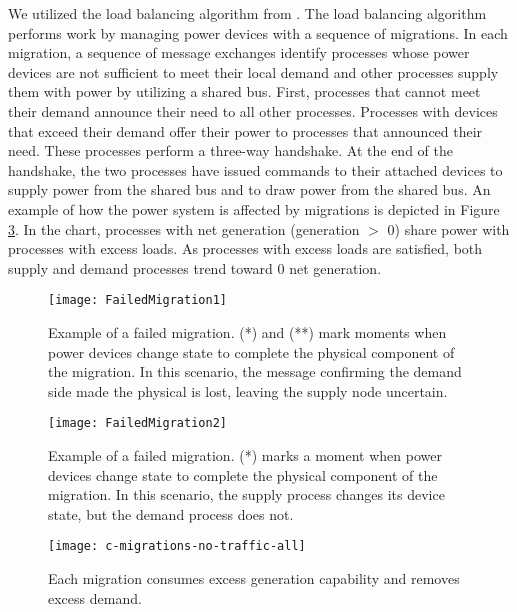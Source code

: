 We utilized the load balancing algorithm from \cite{LOADBALANCING}.
The load balancing algorithm performs work by managing power devices with a sequence of migrations\cite{HILTESTBED}.
In each migration, a sequence of message exchanges identify processes whose power devices are not sufficient to meet their local demand and other processes supply them with power by utilizing a shared bus.
First, processes that cannot meet their demand announce their need to all other processes.
Processes with devices that exceed their demand offer their power to processes that announced their need.
These processes perform a three-way handshake.
At the end of the handshake, the two processes have issued commands to their attached devices to supply power from the shared bus and to draw power from the shared bus.
An example of how the power system is affected by migrations is depicted in Figure \ref{fig:good-migrations}.
In the chart, processes with net generation (generation $>$ 0) share power with processes with excess loads.
As processes with excess loads are satisfied, both supply and demand processes trend toward 0 net generation.

\begin{figure}
\centering
\texttt{[image: FailedMigration1]}
\caption{Example of a failed migration. (*) and (**) mark moments when power devices change state to complete the physical component of the migration. In this scenario, the message confirming the demand side made the physical is lost, leaving the supply node uncertain.}
\label{fig:failed-migration-1}
\end{figure}

\begin{figure}
\centering
\texttt{[image: FailedMigration2]}
\caption{Example of a failed migration. (*) marks a moment when power devices change state to complete the physical component of the migration. In this scenario, the supply process changes its device state, but the demand process does not.}
\label{fig:failed-migration-2}
\end{figure}

\begin{figure}
\centering
\texttt{[image: c-migrations-no-traffic-all]}
\caption{Each migration consumes excess generation capability and removes excess demand.}
\label{fig:good-migrations}
\end{figure}

